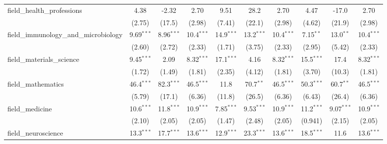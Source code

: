 \begin{tabular}{lccccccccc}
   field\_health\_professions                                  & 4.38          & -2.32         & 2.70          & 9.51          & 28.2           & 2.70          & 4.47          & -17.0         & 2.70\\   
                                                               & (2.75)        & (17.5)        & (2.98)        & (7.41)        & (22.1)         & (2.98)        & (4.62)        & (21.9)        & (2.98)\\   
   field\_immunology\_and\_microbiology                        & 9.69$^{***}$  & 8.96$^{***}$  & 10.4$^{***}$  & 14.9$^{***}$  & 13.2$^{***}$   & 10.4$^{***}$  & 7.15$^{**}$   & 13.0$^{**}$   & 10.4$^{***}$\\   
                                                               & (2.60)        & (2.72)        & (2.33)        & (1.71)        & (3.75)         & (2.33)        & (2.95)        & (5.42)        & (2.33)\\   
   field\_materials\_science                                   & 9.45$^{***}$  & 2.09          & 8.32$^{***}$  & 17.1$^{***}$  & 4.16           & 8.32$^{***}$  & 15.5$^{***}$  & 17.4          & 8.32$^{***}$\\   
                                                               & (1.72)        & (1.49)        & (1.81)        & (2.35)        & (4.12)         & (1.81)        & (3.70)        & (10.3)        & (1.81)\\   
   field\_mathematics                                          & 46.4$^{***}$  & 82.3$^{***}$  & 46.5$^{***}$  & 11.8          & 70.7$^{**}$    & 46.5$^{***}$  & 50.3$^{***}$  & 60.7$^{**}$   & 46.5$^{***}$\\   
                                                               & (5.79)        & (17.1)        & (6.36)        & (11.8)        & (26.5)         & (6.36)        & (6.43)        & (26.4)        & (6.36)\\   
   field\_medicine                                             & 10.6$^{***}$  & 11.8$^{***}$  & 10.9$^{***}$  & 7.85$^{***}$  & 9.53$^{***}$   & 10.9$^{***}$  & 11.2$^{***}$  & 9.07$^{***}$  & 10.9$^{***}$\\   
                                                               & (2.10)        & (2.05)        & (2.05)        & (1.47)        & (2.48)         & (2.05)        & (0.941)       & (2.15)        & (2.05)\\   
   field\_neuroscience                                         & 13.3$^{***}$  & 17.7$^{***}$  & 13.6$^{***}$  & 12.9$^{***}$  & 23.3$^{***}$   & 13.6$^{***}$  & 18.5$^{***}$  & 11.6          & 13.6$^{***}$\\   

\end{tabular}
